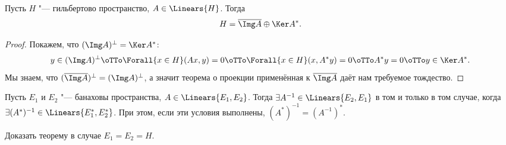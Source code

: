 \documentclass[main]{subfiles}
\begin{document}

\begin{theorem}\label{thm:conjugate-complement}%
  Пусть $H$ "--- гильбертово пространство,
  \( A \in \Linears{H} \). Тогда
  \[
    H = \overline{\Img A} \oplus \Ker A^*.
  \]
\end{theorem}
\begin{proof}
  Покажем, что $(\Img A)^\perp = \Ker A^*$:
  \[
    y \in (\Img A)^\perp
    \oTTo \Forall{x \in H} (Ax, y) = 0
    \oTTo \Forall{x \in H} (x, A^* y) = 0
    \oTTo A^* y = 0
    \oTTo y \in \Ker A^*.
  \]
  Мы знаем, что
  \( (\overline{\Img A})^\perp = (\Img A)^\perp \),
  а значит теорема о проекции
  применённая к \( \overline{\Img A} \)
  даёт нам требуемое тождество.
\end{proof}


\begin{theorem}[б/д]%
  Пусть \( E_1 \) и \( E_2 \) "--- банаховы пространства,
  \( A \in \Linears{E_1, E_2} \).
  Тогда
  \( \exists A^{-1} \in \Linears{E_2, E_1} \)
  в том и только в том случае,
  когда \( \exists (A^*)^{-1} \in \Linears{E_1^*, E_2^*} \).
  При этом, если эти условия выполнены,
  \( (A^*)^{-1} = (A^{-1})^* \).
\end{theorem}

\begin{exercise}
  Доказать теорему в случае \( E_1 = E_2 = H \).
\end{exercise}
\end{document}

